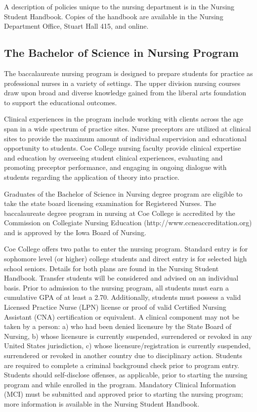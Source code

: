 \documentclass[
  letterpaper,
]{scrbook}
\begin{document}
A description of policies unique to the nursing department is in the
Nursing Student Handbook. Copies of the handbook are available in the
Nursing Department Office, Stuart Hall 415, and online.

\subsection{The Bachelor of Science in Nursing
Program}\label{the-bachelor-of-science-in-nursing-program}

The baccalaureate nursing program is designed to prepare students for
practice as professional nurses in a variety of settings. The upper
division nursing courses draw upon broad and diverse knowledge gained
from the liberal arts foundation to support the educational outcomes.

Clinical experiences in the program include working with clients across
the age span in a wide spectrum of practice sites. Nurse preceptors are
utilized at clinical sites to provide the maximum amount of individual
supervision and educational opportunity to students. Coe College nursing
faculty provide clinical expertise and education by overseeing student
clinical experiences, evaluating and promoting preceptor performance,
and engaging in ongoing dialogue with students regarding the application
of theory into practice.

Graduates of the Bachelor of Science in Nursing degree program are
eligible to take the state board licensing examination for Registered
Nurses. The baccalaureate degree program in nursing at Coe College is
accredited by the Commission on Collegiate Nursing Education
(http://www.ccneaccreditation.org) and is approved by the Iowa Board of
Nursing.

Coe College offers two paths to enter the nursing program. Standard
entry is for sophomore level (or higher) college students and direct
entry is for selected high school seniors. Details for both plans are
found in the Nursing Student Handbook. Transfer students will be
considered and advised on an individual basis. Prior to admission to the
nursing program, all students must earn a cumulative GPA of at least a
2.70. Additionally, students must possess a valid Licensed Practice
Nurse (LPN) license or proof of valid Certified Nursing Assistant (CNA)
certification or equivalent. A clinical component may not be taken by a
person: a) who had been denied licensure by the State Board of Nursing,
b) whose licensure is currently suspended, surrendered or revoked in any
United States jurisdiction, c) whose licensure/registration is currently
suspended, surrendered or revoked in another country due to disciplinary
action. Students are required to complete a criminal background check
prior to program entry. Students should self-disclose offenses, as
applicable, prior to starting the nursing program and while enrolled in
the program. Mandatory Clinical Information (MCI) must be submitted and
approved prior to starting the nursing program; more information is
available in the Nursing Student Handbook.
\end{document}
